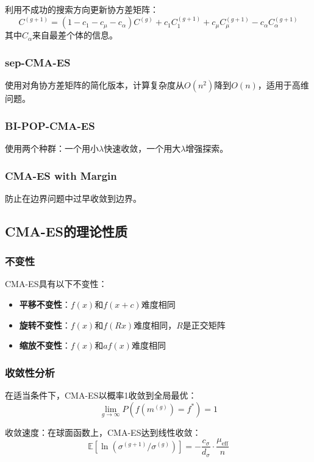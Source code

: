 利用不成功的搜索方向更新协方差矩阵：
\[
C^{(g+1)} = (1 - c_1 - c_\mu - c_\alpha) C^{(g)} + c_1 C_1^{(g+1)} + c_\mu C_\mu^{(g+1)} - c_\alpha C_\alpha^{(g+1)}
\]
其中$C_\alpha$来自最差个体的信息。

\subsubsection{sep-CMA-ES}

使用对角协方差矩阵的简化版本，计算复杂度从$O(n^2)$降到$O(n)$，适用于高维问题。

\subsubsection{BI-POP-CMA-ES}

使用两个种群：一个用小$\lambda$快速收敛，一个用大$\lambda$增强探索。

\subsubsection{CMA-ES with Margin}

防止在边界问题中过早收敛到边界。

\subsection{CMA-ES的理论性质}

\subsubsection{不变性}

CMA-ES具有以下不变性：
\begin{itemize}
    \item \textbf{平移不变性}：$f(x)$和$f(x+c)$难度相同
    \item \textbf{旋转不变性}：$f(x)$和$f(Rx)$难度相同，$R$是正交矩阵
    \item \textbf{缩放不变性}：$f(x)$和$af(x)$难度相同
\end{itemize}

\subsubsection{收敛性分析}

在适当条件下，CMA-ES以概率1收敛到全局最优：
\[
\lim_{g \to \infty} P(f(m^{(g)}) = f^*) = 1
\]

收敛速度：在球面函数上，CMA-ES达到线性收敛：
\[
\mathbb{E}[\ln(\sigma^{(g+1)}/\sigma^{(g)})] = -\frac{c_\sigma}{d_\sigma} \cdot \frac{\mu_{\text{eff}}}{n}
\]

